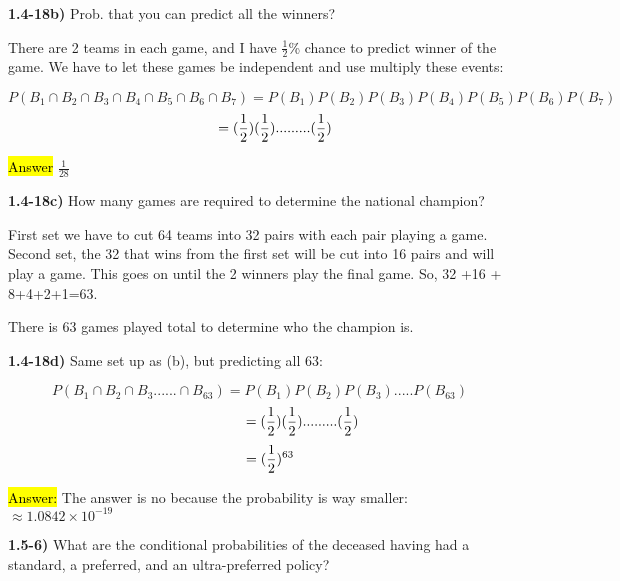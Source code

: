 \documentclass{article}
\begin{document}
\textbf{1.4-18b)} Prob. that you can predict all the winners?
\vspace{2mm}

There are 2 teams in each game, and I have $\frac{1}{2}$\% chance to predict winner of the game. We have to let these games be independent and use multiply these events:

\vspace{2mm}
$$P(B_{1}\cap B_{2}\cap B_{3}\cap B_{4}\cap B_{5}\cap B_{6}\cap B_{7})=P(B_{1}) P(B_{2}) P(B_{3}) P(B_{4}) P(B_{5}) P(B_{6}) P(B_{7})$$
$$\hspace{.3in}=(\frac{1}{2}) (\frac{1}{2}).........(\frac{1}{2})$$
\vspace{2mm}

\hl{Answer} $\frac{1}{28}$

\vspace{5mm}

 
\textbf{1.4-18c)} How many games are required to determine the national champion? 
\vspace{2mm}

First set we have to cut 64 teams into 32 pairs with each pair playing a game. Second set, the 32 that wins from the first set will be cut into 16 pairs and will play a game. This goes on until the 2 winners play the final game. So, 32 +16 + 8+4+2+1=63. 

\vspace{3mm}
There is 63 games played total to determine who the champion is. 


\vspace{5mm}

 
\textbf{1.4-18d)} Same set up as (b), but predicting all 63:


$$P(B_{1}\cap B_{2}\cap B_{3}......\cap B_{63})=P(B_{1}) P(B_{2}) P(B_{3})..... P(B_{63})$$
$$\hspace{.85in}=(\frac{1}{2}) (\frac{1}{2}).........(\frac{1}{2})$$
$$\hspace{.2in}=(\frac{1}{2})^{63}$$
\vspace{2mm}

\hl{Answer:} The answer is no because the probability is way smaller: $\approx 1.0842\times 10^{-19}$

\vspace{2mm}


 
\newpage

\textbf{1.5-6)} What are the conditional probabilities of the deceased having had a standard, a preferred, and an ultra-preferred policy?
\vspace{3mm}
\end{document}
